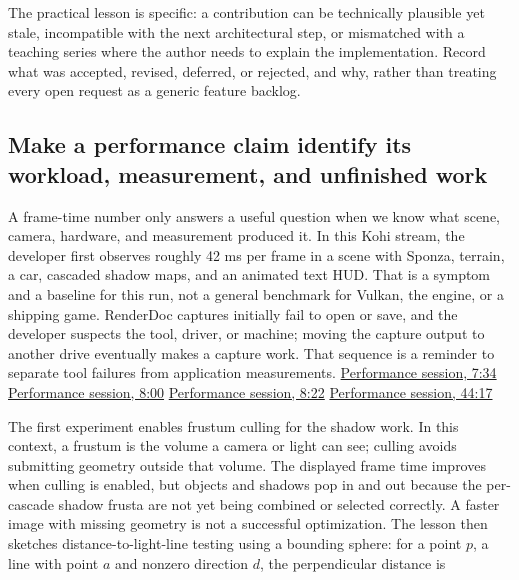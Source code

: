 The practical lesson is specific: a contribution can be technically plausible yet stale, incompatible with the next architectural step, or mismatched with a teaching series where the author needs to explain the implementation. Record what was accepted, revised, deferred, or rejected, and why, rather than treating every open request as a generic feature backlog.

\subsection{Make a performance claim identify its workload, measurement, and unfinished work}\label{06-engine-ii-ch040-make-a-performance-claim-identify-its-workload-measurement-and-unfinished-work}

\hypertarget{06-engine-ii-ch040-make-a-performance-claim-identify-its-workload-measurement-and-unfinished-work}{}

A frame-time number only answers a useful question when we know what scene, camera, hardware, and measurement produced it. In this Kohi stream, the developer first observes roughly 42 ms per frame in a scene with Sponza, terrain, a car, cascaded shadow maps, and an animated text HUD. That is a symptom and a baseline for this run, not a general benchmark for Vulkan, the engine, or a shipping game. RenderDoc captures initially fail to open or save, and the developer suspects the tool, driver, or machine; moving the capture output to another drive eventually makes a capture work. That sequence is a reminder to separate tool failures from application measurements. \href{https://www.youtube.com/watch?v=dJYWL9YAelY&t=454s}{Performance session, 7:34} \href{https://www.youtube.com/watch?v=dJYWL9YAelY&t=480s}{Performance session, 8:00} \href{https://www.youtube.com/watch?v=dJYWL9YAelY&t=499s}{Performance session, 8:22} \href{https://www.youtube.com/watch?v=dJYWL9YAelY&t=2656s}{Performance session, 44:17}

The first experiment enables frustum culling for the shadow work. In this context, a frustum is the volume a camera or light can see; culling avoids submitting geometry outside that volume. The displayed frame time improves when culling is enabled, but objects and shadows pop in and out because the per-cascade shadow frusta are not yet being combined or selected correctly. A faster image with missing geometry is not a successful optimization. The lesson then sketches distance-to-light-line testing using a bounding sphere: for a point \(p\), a line with point \(a\) and nonzero direction \(d\), the perpendicular distance is

